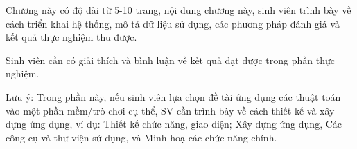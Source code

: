 \documentclass[../BTL.tex]{subfiles}
\begin{document}
Chương này có độ dài từ 5-10 trang, nội dung chương này, sinh viên trình bày về cách triển khai hệ thống, mô tả dữ liệu sử dụng, các phương pháp đánh giá và kết quả thực nghiệm thu được.

Sinh viên cần có giải thích và bình luận về kết quả đạt được trong phần thực nghiệm.

Lưu ý: Trong phần này, nếu sinh viên lựa chọn đề tài ứng dụng các thuật toán vào một phần mềm/trò chơi cụ thể, SV cần trình bày về cách thiết kế và xây dựng ứng dụng, ví dụ: Thiết kế chức năng, giao diện; Xây dựng ứng dụng, Các công cụ và thư viện sử dụng, và Minh hoạ các chức năng chính.
\end{document}
